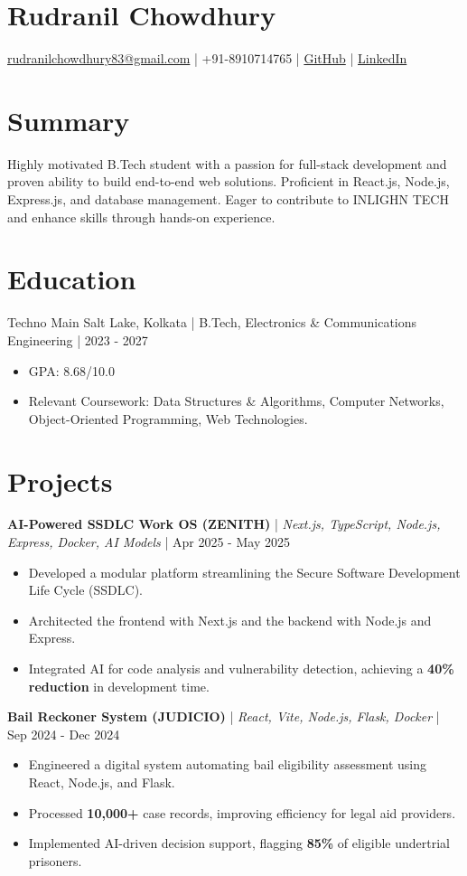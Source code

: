 \documentclass{article}
\begin{document}
\section*{Rudranil Chowdhury}
\href{mailto:rudranilchowdhury83@gmail.com}{rudranilchowdhury83@gmail.com} | +91-8910714765 | \href{https://github.com/}{GitHub} | \href{https://linkedin.com/}{LinkedIn}

\section*{Summary}
Highly motivated B.Tech student with a passion for full-stack development and proven ability to build end-to-end web solutions. Proficient in React.js, Node.js, Express.js, and database management. Eager to contribute to INLIGHN TECH and enhance skills through hands-on experience.

\section*{Education}
Techno Main Salt Lake, Kolkata | B.Tech, Electronics & Communications Engineering | 2023 - 2027
\begin{itemize}[leftmargin=*]
    \item GPA: 8.68/10.0
    \item Relevant Coursework: Data Structures \& Algorithms, Computer Networks, Object-Oriented Programming, Web Technologies.
\end{itemize}

\section*{Projects}
\textbf{AI-Powered SSDLC Work OS (ZENITH)} | \textit{Next.js, TypeScript, Node.js, Express, Docker, AI Models} | Apr 2025 - May 2025
\begin{itemize}[leftmargin=*]
    \item Developed a modular platform streamlining the Secure Software Development Life Cycle (SSDLC).
    \item Architected the frontend with Next.js and the backend with Node.js and Express.
    \item Integrated AI for code analysis and vulnerability detection, achieving a \textbf{40\% reduction} in development time.
\end{itemize}

\textbf{Bail Reckoner System (JUDICIO)} | \textit{React, Vite, Node.js, Flask, Docker} | Sep 2024 - Dec 2024
\begin{itemize}[leftmargin=*]
    \item Engineered a digital system automating bail eligibility assessment using React, Node.js, and Flask.
    \item Processed \textbf{10,000+} case records, improving efficiency for legal aid providers.
    \item Implemented AI-driven decision support, flagging \textbf{85\%} of eligible undertrial prisoners.
\end{itemize}
\end{document}
